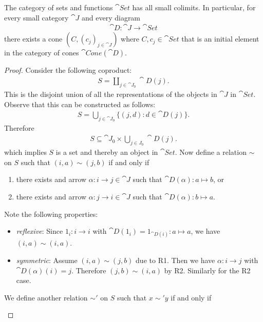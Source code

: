 \documentclass{article}
\begin{document}
\begin{claim*}
   The category of sets and functions $\cat{Set}$ has all small colimits.
   In particular, for every small category $\cat J$ and every diagram 
   \begin{align*}
      \cat D : \cat J \to \cat{Set}
   \end{align*}
   there exists a cone $(C, (c_j)_{j\in\cat J})$ where $C,c_j\in\cat{Set}$
   that is an initial element in the category of cones $\cat{Cone}(\cat D)$.
\end{claim*}

\begin{proof}
   Consider the following coproduct:
   \begin{align*}
      S = \coprod_{j\in\cat J_0} \cat D(j).
   \end{align*}
   This is the disjoint union of all the representations of the objects in $\cat J$
   in $\cat{Set}$. Observe that this can be constructed as follows:
   \begin{align*}
      S = \bigcup_{j\in\cat J_0}\{(j, d) : d \in \cat D(j)\}. 
   \end{align*}
   Therefore
   \begin{align*}
      S \subseteq \cat J_0 \times \bigcup_{j\in J_0} \cat D(j).
   \end{align*}
   which implies $S$ is a set and thereby an object in $\cat{Set}$.
   Now define a relation $\sim$ on $S$
   such that $(i,a)\sim (j,b)$ if and only if 
   \begin{enumerate}[label=R\arabic*.]
      \item there exists and arrow $\alpha:i\to j\in\cat J$ such that $\cat D(\alpha): a \mapsto b$, or  
      \item there exists and arrow $\alpha:j\to i\in\cat J$ such that $\cat D(\alpha): b \mapsto a$.
   \end{enumerate}
   Note the following properties:
   \begin{itemize}
      \item \emph{reflexive}: Since $1_i:i\to i$ with $\cat D(1_i)=1_{\cat D(i)}:a\mapsto a$, we have $(i,a)\sim(i,a)$.
      \item \emph{symmetric}: Assume $(i,a)\sim(j,b)$ due to R1. Then we have $\alpha:i\to j$ with $\cat D(\alpha)(i) = j$.
         Therefore $(j,b)\sim (i,a)$ by R2. Similarly for the R2 case.
   \end{itemize}
   We define another relation $\sim'$ on $S$ such that $x\sim'y$ if and only if
   \begin{enumerate}[label=E\arabic*.]

\end{enumerate}
\end{proof}
\end{document}
